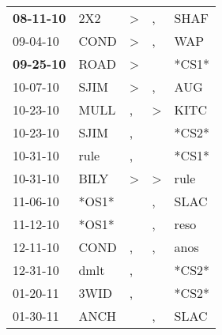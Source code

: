 \begin{supertabular}{p{0.07\textwidth}p{0.06\textwidth}p{0.02\textwidth}p{0.02\textwidth}p{0.06\textwidth}}
 \textbf{08-11-10\textsuperscript{}} &            2X2\textsuperscript{} &     \textgreater &                , &           SHAF\textsuperscript{} \\
          09-04-10\textsuperscript{} &           COND\textsuperscript{} &     \textgreater &                , &            WAP\textsuperscript{} \\
 \textbf{09-25-10\textsuperscript{}} &           ROAD\textsuperscript{} &     \textgreater &                  &                            *CS1* \\
          10-07-10\textsuperscript{} &           SJIM\textsuperscript{} &     \textgreater &                , &            AUG\textsuperscript{} \\
          10-23-10\textsuperscript{} &           MULL\textsuperscript{} &                , &     \textgreater &           KITC\textsuperscript{} \\
          10-23-10\textsuperscript{} &           SJIM\textsuperscript{} &                , &                  &                            *CS2* \\
          10-31-10\textsuperscript{} &           rule\textsuperscript{} &                , &                  &                            *CS1* \\
          10-31-10\textsuperscript{} &           BILY\textsuperscript{} &     \textgreater &     \textgreater &           rule\textsuperscript{} \\
          11-06-10\textsuperscript{} &                            *OS1* &                  &                , &           SLAC\textsuperscript{} \\
          11-12-10\textsuperscript{} &                            *OS1* &                  &                , &           reso\textsuperscript{} \\
          12-11-10\textsuperscript{} &           COND\textsuperscript{} &                , &                , &           anos\textsuperscript{} \\
          12-31-10\textsuperscript{} &           dmlt\textsuperscript{} &                , &                  &                            *CS2* \\
          01-20-11\textsuperscript{} &           3WID\textsuperscript{} &                , &                  &                            *CS2* \\
          01-30-11\textsuperscript{} &           ANCH\textsuperscript{} &                  &                , &           SLAC\textsuperscript{} \\

\end{supertabular}
